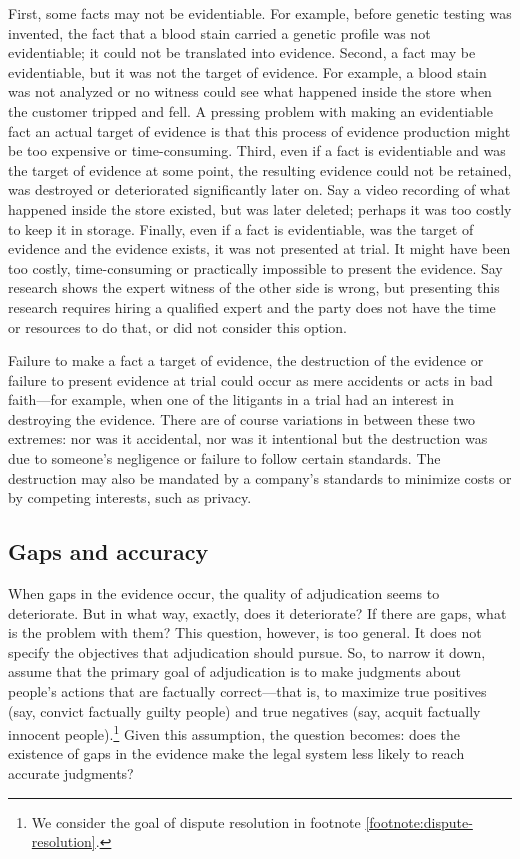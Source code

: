 \documentclass[
  10pt,
  dvipsnames,enabledeprecatedfontcommands]{scrartcl}
\begin{document}
First, some facts may not be evidentiable. For example, before genetic
testing was invented, the fact that a blood stain carried a genetic
profile was not evidentiable; it could not be translated into evidence.
Second, a fact may be evidentiable, but it was not the target of
evidence. For example, a blood stain was not analyzed or no witness
could see what happened inside the store when the customer tripped and
fell. A pressing problem with making an evidentiable fact an actual
target of evidence is that this process of evidence production might be
too expensive or time-consuming. Third, even if a fact is evidentiable
and was the target of evidence at some point, the resulting evidence
could not be retained, was destroyed or deteriorated significantly later
on. Say a video recording of what happened inside the store existed, but
was later deleted; perhaps it was too costly to keep it in storage.
Finally, even if a fact is evidentiable, was the target of evidence and
the evidence exists, it was not presented at trial. It might have been
too costly, time-consuming or practically impossible to present the
evidence. Say research shows the expert witness of the other side is
wrong, but presenting this research requires hiring a qualified expert
and the party does not have the time or resources to do that, or did not
consider this option.

Failure to make a fact a target of evidence, the destruction of the
evidence or failure to present evidence at trial could occur as mere
accidents or acts in bad faith---for example, when one of the litigants
in a trial had an interest in destroying the evidence. There are of
course variations in between these two extremes: nor was it accidental,
nor was it intentional but the destruction was due to someone's
negligence or failure to follow certain standards. The destruction may
also be mandated by a company's standards to minimize costs or by
competing interests, such as privacy.

\hypertarget{gaps-and-accuracy}{%
\subsection{Gaps and accuracy}\label{gaps-and-accuracy}}

When gaps in the evidence occur, the quality of adjudication seems to
deteriorate. But in what way, exactly, does it deteriorate? If there are
gaps, what is the problem with them? This question, however, is too
general. It does not specify the objectives that adjudication should
pursue. So, to narrow it down, assume that the primary goal of
adjudication is to make judgments about people's actions that are
factually correct---that is, to maximize true positives (say, convict
factually guilty people) and true negatives (say, acquit factually
innocent people).\footnote{We consider the goal of dispute resolution in
  footnote \ref{footnote:dispute-resolution}.} Given this assumption,
the question becomes: does the existence of gaps in the evidence make
the legal system less likely to reach accurate judgments?
\end{document}
